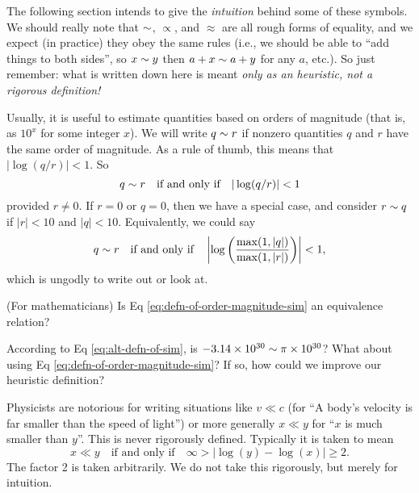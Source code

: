 \begin{ddanger}
The following section intends to give the \emph{intuition} behind some
of these symbols. We should really note that $\sim$, $\propto$, and
$\approx$ are all rough forms of equality, and we expect (in practice)
they obey the same rules (i.e., we should be able to ``add things to
both sides'', so $x\sim y$ then $a+x\sim a+y$ for any $a$, etc.). So
just remember: what is written down here is meant
\emph{only as an heuristic, not a rigorous definition!}
\end{ddanger}

Usually, it is useful to estimate quantities based on orders of
magnitude (that is, as $10^{x}$ for some integer $x$). We will write
$q\sim r$ if nonzero quantities $q$ and $r$ have the same order of
magnitude. As a rule of thumb, this means that $|\log(q/r)|< 1$. So
\begin{equation}\label{eq:defn-of-order-magnitude-sim}
q\sim r\quad\mbox{if and only if}\quad |\log(q/r)|< 1
\end{equation}
provided $r\neq0$. If $r=0$ or $q=0$, then we have a special case, and
consider $r\sim q$ if $|r|<10$ and $|q|<10$. Equivalently, we could say
\begin{equation}\label{eq:alt-defn-of-sim}
q\sim r\quad\mbox{if and only if}\quad \left|\log\left(\frac{\max(1,
|q|)}{\max(1, |r|)}\right)\right| < 1,
\end{equation}
which is ungodly to write out or look at.

 (For mathematicians) Is Eq \eqref{eq:defn-of-order-magnitude-sim}
an equivalence relation?

 According to Eq \eqref{eq:alt-defn-of-sim}, is
$-3.14\times10^{30}\sim\pi\times10^{30}$? What about using Eq \eqref{eq:defn-of-order-magnitude-sim}?
If so, how could we improve our heuristic definition?

Physicists are notorious for writing situations like $v\ll c$ (for ``A
body's velocity is far smaller than the speed of light'') or more
generally $x\ll y$ for ``$x$ is much smaller than $y$''. This is never
rigorously defined. Typically it is taken to mean
\begin{equation}
x\ll y\quad\mbox{if and only if}\quad \infty>|\log(y)-\log(x)|\geq2.
\end{equation}
The factor 2 is taken arbitrarily. We do not take this rigorously, but
merely for intuition.

